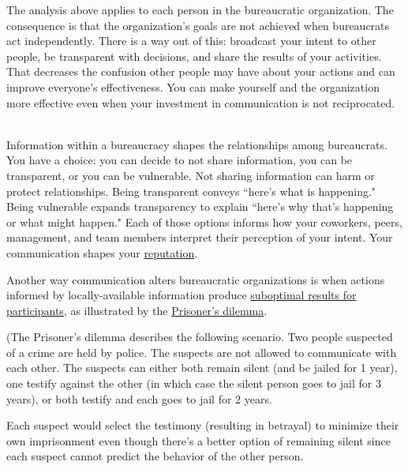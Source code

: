 The analysis above applies to each person in the bureaucratic organization.
The consequence is that the organization's goals are not achieved when bureaucrats act independently. 
There is a way out of this: broadcast your intent to other people, be transparent with decisions, and share the results of your activities. That decreases the confusion other people may have about your actions and can improve everyone's effectiveness. You can make yourself and the organization more effective even when your investment in communication is not reciprocated.

\ \\

Information within a bureaucracy shapes the relationships among bureaucrats. You have a choice: you can decide to not share information, you can be transparent, or you can be vulnerable.  
Not sharing information can harm or protect relationships. 
Being transparent conveys ``here's what is happening." Being vulnerable expands transparency to explain ``here's why that's happening or what might happen."
Each of those options informs how your coworkers, peers, management, and team members interpret their perception of your intent. Your communication shapes your \hyperref[sec:reputation]{reputation}.


Another way communication alters bureaucratic organizations is when actions informed by locally-available information produce \hyperref[sec:failure-to-comm]{suboptimal results for participants}, 
as illustrated by the
\href{https://en.wikipedia.org/wiki/Prisoner\%27s\_dilemma}{Prisoner's dilemma}. 

\begin{mdframed}[frametitle={Prisoner's Dilemma},frametitlerule=true,frametitlealignment=\centering]
(The Prisoner's dilemma describes the following scenario. Two people suspected of a crime are held by police. The suspects are not allowed to communicate with each other. The suspects can either both remain silent (and be jailed for 1 year), one testify against the other (in which case the silent person goes to jail for 3 years), or both testify and each goes to jail for 2 years.

Each suspect would select the testimony (resulting in betrayal) to minimize their own imprisonment even though there's a better option of remaining silent since each suspect cannot predict the behavior of the other person. 
\label{prisoners_dilemma_explanation}
\end{mdframed}

